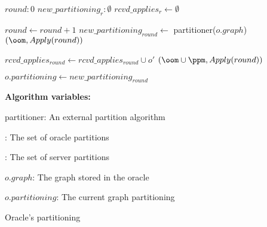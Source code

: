 \begin{algorithm}[htb]
    \small

    \begin{distribalgo}[1]

        \vspace{1.5mm}

            \STATE $round: 0$
            \STATE $new\_partitioning_{r}: \emptyset$
            \STATE $rcvd\_applies_{r} \leftarrow \emptyset$

        \ENDINDENT
        \vspace{1.5mm}
            \vspace{1.5mm}
                \STATE $round \leftarrow round + 1$
                \STATE $new\_partitioning_{round} \leftarrow$ partitioner($o.graph$)
                \STATE \rmcast$(\oom, Apply(round))$
            \ENDINDENT

            \vspace{1.5mm}

                \STATE $rcvd\_applies_{round} \leftarrow rcvd\_applies_{round} \cup o'$
                    \STATE \amcast$(\oom \cup \ppm, Apply(round))$
                \ENDIF
            \ENDINDENT

            \vspace{1.5mm}
            
                \STATE $o.partitioning \leftarrow new\_partitioning_{round}$
            \ENDINDENT

        \ENDINDENT

    \vspace{1.7mm}

    \textbf{Algorithm variables:}

    \vspace{1.25mm}

    partitioner: An external partition algorithm

    \vspace{1.25mm}

    \oo: The set of oracle partitions

    \vspace{1.25mm}
    
    \pp: The set of server partitions

    \vspace{1.25mm}

    $o.graph$: The graph stored in the oracle

    \vspace{1.25mm}

    $o.partitioning$: The current graph partitioning

    \caption{Oracle's partitioning}
    \label{alg:oracle_partition}
\end{distribalgo}
\end{algorithm}
